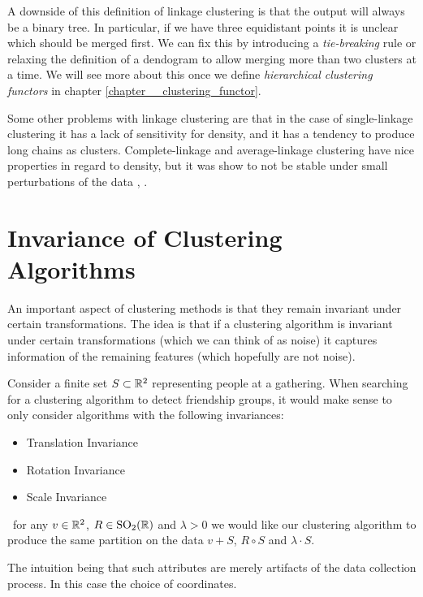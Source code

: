 A downside of this definition of linkage clustering is that the output will always be a binary tree. In particular, if we have three equidistant points it is unclear which should be merged first. We can fix this by introducing a \emph{tie-breaking} rule or relaxing the definition of a dendogram to allow merging more than two clusters at a time. We will see more about this once 
we define \emph{hierarchical clustering functors} in chapter \ref{chapter__clustering_functor}.

Some other problems with linkage clustering are that in the case of single-linkage clustering it has a lack of sensitivity for density, and it has a tendency to produce long chains as clusters. Complete-linkage and average-linkage clustering have nice properties in regard to density, but it was show to not be stable under small perturbations of the data \cite[Sec.~3.6]{JMLR:v11:carlsson10a}, \cite{Lance1967-ci}.

\section{Invariance of Clustering Algorithms}
\label{seciton__preserving_structure}
An important aspect of clustering methods is that they remain invariant under certain transformations.
The idea is that if a clustering algorithm is invariant under certain transformations (which we can think of as noise) it captures information of the remaining features (which hopefully are not noise).

\begin{example}{}{}
Consider a finite set $S \subset \mathbb R^2$ representing people at a gathering. When searching for a clustering algorithm to detect friendship groups, it would make sense to only consider algorithms with the following invariances:
\begin{itemize}
    \item Translation Invariance
    \item Rotation Invariance
    \item Scale Invariance
\end{itemize}
\Ie\ for any $v \in \mathbb R^2$, $R \in \mathrm{SO}_2(\mathbb R)$ and $\lambda > 0$ we would like our clustering algorithm to produce the same partition on the data $v + S$, $R \circ S$ and $\lambda \cdot S$.

The intuition being that such attributes are merely artifacts of the data collection process. In this case the choice of coordinates.
\end{example}

